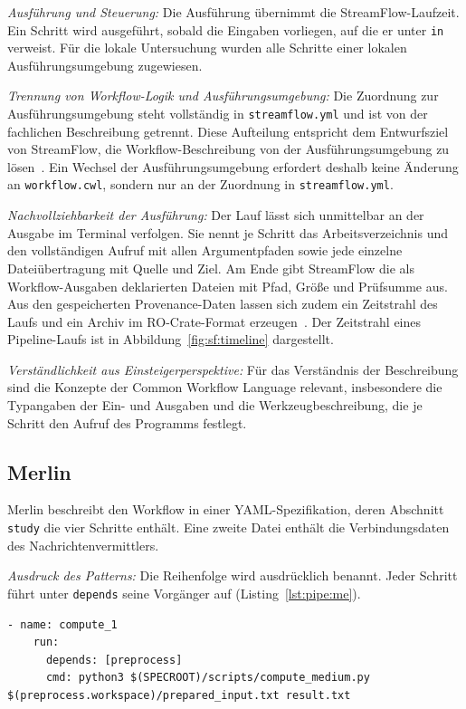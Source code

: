 \emph{Ausführung und Steuerung:} Die Ausführung übernimmt die
StreamFlow-Laufzeit. Ein Schritt wird ausgeführt, sobald die
Eingaben vorliegen, auf die er unter \texttt{in} verweist. Für die
lokale Untersuchung wurden alle Schritte einer lokalen
Ausführungsumgebung zugewiesen.

\emph{Trennung von Workflow-Logik und Ausführungsumgebung:} Die
Zuordnung zur Ausführungsumgebung steht vollständig in
\texttt{streamflow.yml} und ist von der fachlichen Beschreibung
getrennt. Diese Aufteilung entspricht dem Entwurfsziel von
StreamFlow, die Workflow-Beschreibung von der Ausführungsumgebung
zu lösen~\cite[S.~1723]{colonnelli2021streamflow}. Ein Wechsel der
Ausführungsumgebung erfordert deshalb keine Änderung an
\texttt{workflow.cwl}, sondern nur an der Zuordnung in
\texttt{streamflow.yml}.


\emph{Nachvollziehbarkeit der Ausführung:} Der Lauf lässt sich
unmittelbar an der Ausgabe im Terminal verfolgen. Sie nennt je Schritt
das Arbeitsverzeichnis und den vollständigen Aufruf mit allen
Argumentpfaden sowie jede einzelne Dateiübertragung mit Quelle und
Ziel. Am Ende gibt StreamFlow die als Workflow-Ausgaben deklarierten
Dateien mit Pfad, Größe und Prüfsumme aus. Aus den gespeicherten
Provenance-Daten lassen sich zudem ein Zeitstrahl des Laufs und ein
Archiv im RO-Crate-Format erzeugen~\cite{streamflowdocs-inspect}. Der
Zeitstrahl eines Pipeline-Laufs ist in
Abbildung~\ref{fig:sf:timeline} dargestellt.

\emph{Verständlichkeit aus Einsteigerperspektive:} Für das
Verständnis der Beschreibung sind die Konzepte der Common Workflow
Language relevant, insbesondere die Typangaben der Ein- und
Ausgaben und die Werkzeugbeschreibung, die je Schritt den Aufruf
des Programms festlegt.

\subsection{Merlin}
\label{sec:lokal:pipeline:merlin}

Merlin beschreibt den Workflow in einer YAML-Spezifikation, deren
Abschnitt \texttt{study} die vier Schritte enthält. Eine zweite Datei
enthält die Verbindungsdaten des Nachrichtenvermittlers.

\emph{Ausdruck des Patterns:} Die Reihenfolge wird ausdrücklich
benannt. Jeder Schritt führt unter \texttt{depends} seine Vorgänger
auf (Listing~\ref{lst:pipe:me}).

\begin{lstlisting}[caption={Abhängigkeit und Datenweitergabe eines Schritts (Merlin, Pipeline)},label={lst:pipe:me}]
  - name: compute_1
    run:
      depends: [preprocess]
      cmd: python3 $(SPECROOT)/scripts/compute_medium.py $(preprocess.workspace)/prepared_input.txt result.txt
\end{lstlisting}

